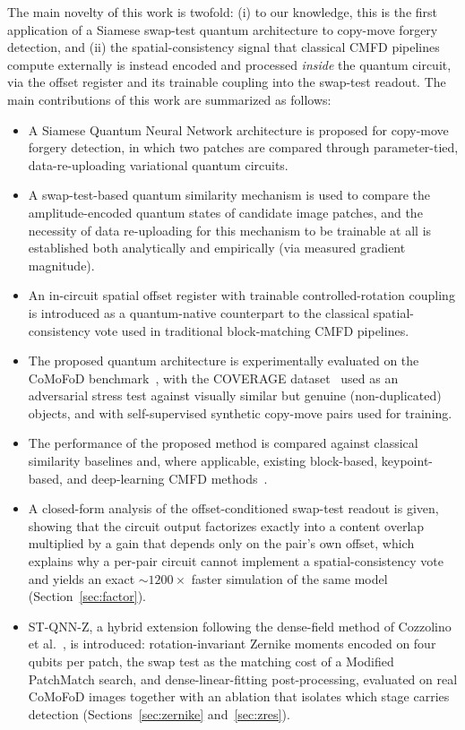 \documentclass[conference]{IEEEtran}
\begin{document}
The main novelty of this work is twofold: (i) to our knowledge, this is the first application of a Siamese swap-test quantum architecture to copy-move forgery detection, and (ii) the spatial-consistency signal that classical CMFD pipelines compute externally is instead encoded and processed \emph{inside} the quantum circuit, via the offset register and its trainable coupling into the swap-test readout. The main contributions of this work are summarized as follows:
\begin{itemize}
\item A Siamese Quantum Neural Network architecture is proposed for copy-move forgery detection, in which two patches are compared through parameter-tied, data-re-uploading variational quantum circuits.
\item A swap-test-based quantum similarity mechanism is used to compare the amplitude-encoded quantum states of candidate image patches, and the necessity of data re-uploading for this mechanism to be trainable at all is established both analytically and empirically (via measured gradient magnitude).
\item An in-circuit spatial offset register with trainable controlled-rotation coupling is introduced as a quantum-native counterpart to the classical spatial-consistency vote used in traditional block-matching CMFD pipelines.
\item The proposed quantum architecture is experimentally evaluated on the CoMoFoD benchmark~\cite{comofod2013}, with the COVERAGE dataset~\cite{coverage2016} used as an adversarial stress test against visually similar but genuine (non-duplicated) objects, and with self-supervised synthetic copy-move pairs used for training.
\item The performance of the proposed method is compared against classical similarity baselines and, where applicable, existing block-based, keypoint-based, and deep-learning CMFD methods~\cite{fridrich2003,amerini2011,busternet2018}.
\item A closed-form analysis of the offset-conditioned swap-test readout is given, showing that the circuit output factorizes exactly into a content overlap multiplied by a gain that depends only on the pair's own offset, which explains why a per-pair circuit cannot implement a spatial-consistency vote and yields an exact $\sim\!1200\times$ faster simulation of the same model (Section~\ref{sec:factor}).
\item ST-QNN-Z, a hybrid extension following the dense-field method of Cozzolino et al.~\cite{cozzolino2015}, is introduced: rotation-invariant Zernike moments encoded on four qubits per patch, the swap test as the matching cost of a Modified PatchMatch search, and dense-linear-fitting post-processing, evaluated on real CoMoFoD images together with an ablation that isolates which stage carries detection (Sections~\ref{sec:zernike} and~\ref{sec:zres}).
\end{itemize}
\end{document}
